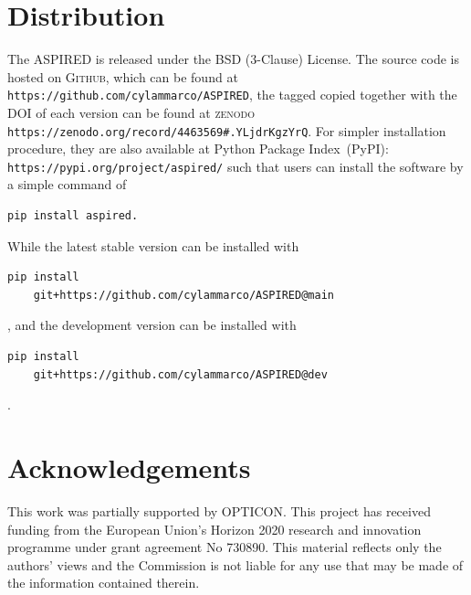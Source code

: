 \documentclass[fleqn,usenatbib]{mnras}
\begin{document}






\section{Distribution}
The \textsc{ASPIRED} is released under the BSD (3-Clause) License. The
source code is hosted on \textsc{Github}, which can be found at
\verb+https://github.com/cylammarco/ASPIRED+, the tagged copied together
with the DOI of each version can be found at
\textsc{zenodo} \verb+https://zenodo.org/record/4463569#.YLjdrKgzYrQ+.
For simpler installation procedure, they are also available at Python
Package Index~(PyPI): \verb+https://pypi.org/project/aspired/+ such that
users can install the software by a simple command of 
\begin{verbatim}
pip install aspired.
\end{verbatim}
While the latest stable version can be installed with
\begin{verbatim}
pip install 
    git+https://github.com/cylammarco/ASPIRED@main
\end{verbatim},
and the development version can be installed with 
\begin{verbatim}
pip install 
    git+https://github.com/cylammarco/ASPIRED@dev
\end{verbatim}.

\section*{Acknowledgements}
This work was partially supported by OPTICON. This project has
received funding from the European Union’s Horizon 2020 research and
innovation programme under grant agreement No 730890. This material
reflects only the authors' views and the Commission is not liable for
any use that may be made of the information contained therein.
\end{document}

